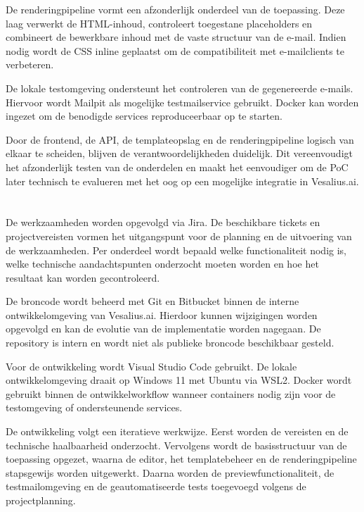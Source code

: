De renderingpipeline vormt een afzonderlijk onderdeel van de toepassing.
Deze laag verwerkt de HTML-inhoud, controleert toegestane placeholders en
combineert de bewerkbare inhoud met de vaste structuur van de e-mail. Indien
nodig wordt de CSS inline geplaatst om de compatibiliteit met e-mailclients
te verbeteren.

De lokale testomgeving ondersteunt het controleren van de gegenereerde
e-mails. Hiervoor wordt Mailpit als mogelijke testmailservice gebruikt.
Docker kan worden ingezet om de benodigde services reproduceerbaar op te
starten.

Door de frontend, de API, de templateopslag en de renderingpipeline logisch
van elkaar te scheiden, blijven de verantwoordelijkheden duidelijk. Dit
vereenvoudigt het afzonderlijk testen van de onderdelen en maakt het
eenvoudiger om de PoC later technisch te evalueren met het oog op een
mogelijke integratie in Vesalius.ai.

\section{}%
\label{sec:werkwijze}
De werkzaamheden worden opgevolgd via Jira. De beschikbare tickets en
projectvereisten vormen het uitgangspunt voor de planning en de uitvoering
van de werkzaamheden. Per onderdeel wordt bepaald welke functionaliteit nodig
is, welke technische aandachtspunten onderzocht moeten worden en hoe het
resultaat kan worden gecontroleerd.

De broncode wordt beheerd met Git en Bitbucket binnen de interne
ontwikkelomgeving van Vesalius.ai. Hierdoor kunnen wijzigingen worden
opgevolgd en kan de evolutie van de implementatie worden nagegaan. De
repository is intern en wordt niet als publieke broncode beschikbaar gesteld.

Voor de ontwikkeling wordt Visual Studio Code gebruikt. De lokale
ontwikkelomgeving draait op Windows 11 met Ubuntu via WSL2. Docker wordt
gebruikt binnen de ontwikkelworkflow wanneer containers nodig zijn voor de
testomgeving of ondersteunende services.

De ontwikkeling volgt een iteratieve werkwijze. Eerst worden de vereisten en
de technische haalbaarheid onderzocht. Vervolgens wordt de basisstructuur van
de toepassing opgezet, waarna de editor, het templatebeheer en de
renderingpipeline stapsgewijs worden uitgewerkt. Daarna worden de
previewfunctionaliteit, de testmailomgeving en de geautomatiseerde tests
toegevoegd volgens de projectplanning.

